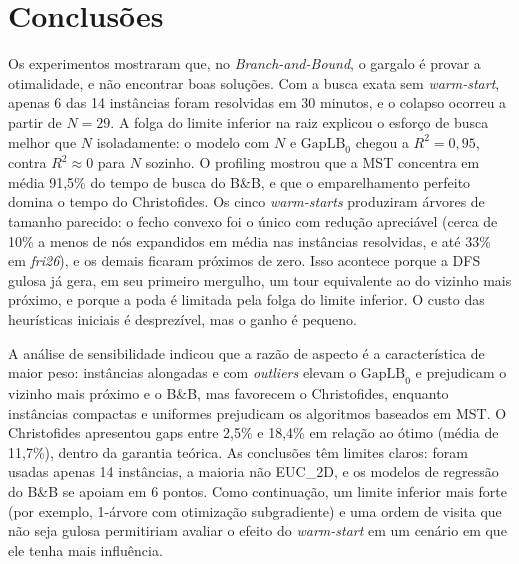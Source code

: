 \documentclass[12pt]{article}
\begin{document}
\section{Conclusões}

Os experimentos mostraram que, no \textit{Branch-and-Bound}, o gargalo é provar a otimalidade, e não encontrar boas soluções. Com a busca exata sem \textit{warm-start}, apenas 6 das 14 instâncias foram resolvidas em 30 minutos, e o colapso ocorreu a partir de $N = 29$. A folga do limite inferior na raiz explicou o esforço de busca melhor que $N$ isoladamente: o modelo com $N$ e $\text{GapLB}_0$ chegou a $R^2 = 0{,}95$, contra $R^2 \approx 0$ para $N$ sozinho. O profiling mostrou que a MST concentra em média 91,5\% do tempo de busca do B\&B, e que o emparelhamento perfeito domina o tempo do Christofides. Os cinco \textit{warm-starts} produziram árvores de tamanho parecido: o fecho convexo foi o único com redução apreciável (cerca de 10\% a menos de nós expandidos em média nas instâncias resolvidas, e até 33\% em \textit{fri26}), e os demais ficaram próximos de zero. Isso acontece porque a DFS gulosa já gera, em seu primeiro mergulho, um tour equivalente ao do vizinho mais próximo, e porque a poda é limitada pela folga do limite inferior. O custo das heurísticas iniciais é desprezível, mas o ganho é pequeno.

A análise de sensibilidade indicou que a razão de aspecto é a característica de maior peso: instâncias alongadas e com \textit{outliers} elevam o $\text{GapLB}_0$ e prejudicam o vizinho mais próximo e o B\&B, mas favorecem o Christofides, enquanto instâncias compactas e uniformes prejudicam os algoritmos baseados em MST. O Christofides apresentou gaps entre 2,5\% e 18,4\% em relação ao ótimo (média de 11,7\%), dentro da garantia teórica. As conclusões têm limites claros: foram usadas apenas 14 instâncias, a maioria não EUC\_2D, e os modelos de regressão do B\&B se apoiam em 6 pontos. Como continuação, um limite inferior mais forte (por exemplo, 1-árvore com otimização subgradiente) e uma ordem de visita que não seja gulosa permitiriam avaliar o efeito do \textit{warm-start} em um cenário em que ele tenha mais influência.




\cite{reinelt1991tsplib}
\end{document}
